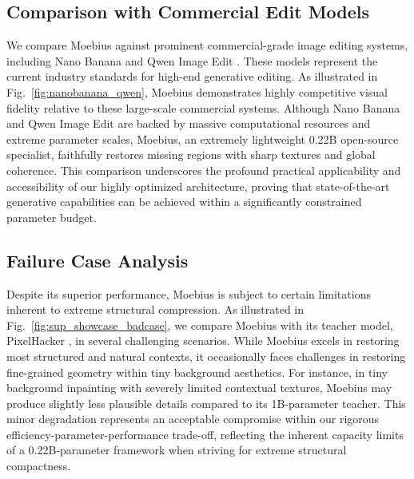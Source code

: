 \documentclass{llmxive}
\begin{document}
\subsection*{Comparison with Commercial Edit Models} \label{sec:sup_commercial}
We compare Moebius against prominent commercial-grade image editing systems, including Nano Banana \cite{2025nano_banana} and Qwen Image Edit \cite{wu2025qwenimagetechnicalreport}. These models represent the current industry standards for high-end generative editing. As illustrated in Fig.~\ref{fig:nanobanana_qwen}, Moebius demonstrates highly competitive visual fidelity relative to these large-scale commercial systems. Although Nano Banana and Qwen Image Edit are backed by massive computational resources and extreme parameter scales, Moebius, an extremely lightweight 0.22B open-source specialist, faithfully restores missing regions with sharp textures and global coherence. This comparison underscores the profound practical applicability and accessibility of our highly optimized architecture, proving that state-of-the-art generative capabilities can be achieved within a significantly constrained parameter budget.


\vspace{-0.5em}
\subsection*{Failure Case Analysis} \label{sec:sup_failure}
\vspace{-2.5em}
Despite its superior performance, Moebius is subject to certain limitations inherent to extreme structural compression. As illustrated in Fig.~\ref{fig:sup_showcase_badcase}, we compare Moebius with its teacher model, PixelHacker \cite{xu2025pixelhacker}, in several challenging scenarios. While Moebius excels in restoring most structured and natural contexts, it occasionally faces challenges in restoring fine-grained geometry within tiny background aesthetics. For instance, in tiny background inpainting with severely limited contextual textures, Moebius may produce slightly less plausible details compared to its 1B-parameter teacher. This minor degradation represents an acceptable compromise within our rigorous efficiency-parameter-performance trade-off, reflecting the inherent capacity limits of a 0.22B-parameter framework when striving for extreme structural compactness.
\end{document}
